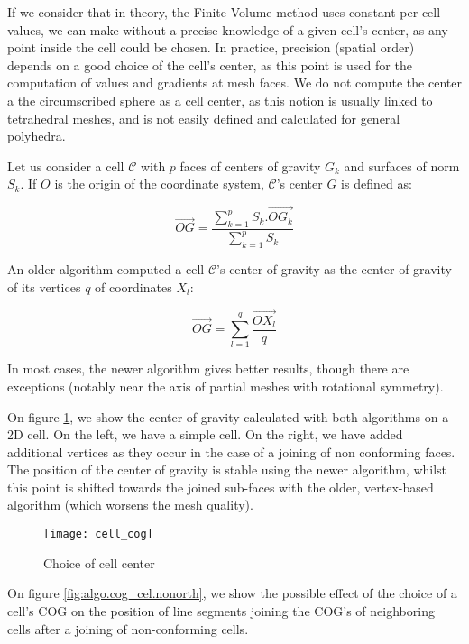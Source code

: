 If we consider that in theory, the Finite Volume method uses constant
per-cell values, we can make without a precise knowledge of a given cell's
center, as any point inside the cell could be chosen.
In practice, precision (spatial order) depends on a good choice of
the cell's center, as this point is used for the computation of values
and gradients at mesh faces.
We do not compute the center a the circumscribed sphere as
a cell center, as this notion is usually linked to tetrahedral meshes,
and is not easily defined and calculated for general polyhedra.

Let us consider a cell $\mathcal{C}$ with $p$ faces of centers of gravity
$G_k$ and surfaces of norm $S_k$. If $O$ is the origin of the coordinate
system, $\mathcal{C}$'s center $G$ is defined as:

\begin{displaymath}
\overrightarrow{OG}
= \frac{\sum_{k=1}^p S_k.\overrightarrow{OG_k}}
       {\sum_{k=1}^p S_k}
\end{displaymath}

An older algorithm computed a cell $\mathcal{C}$'s center of gravity as the
center of gravity of its vertices $q$ of coordinates $X_l$:

$$\overrightarrow{OG} = \sum_{l=1}^q \frac{\overrightarrow{OX_l}}{q}$$

In most cases, the newer algorithm gives better results, though there
are exceptions (notably near the axis of partial meshes with rotational symmetry).

On figure \ref{fig:algo.cog_cel.loc}, we show the center of gravity
calculated with both algorithms on a 2D cell. On the left, we have
a simple cell. On the right, we have added additional vertices as they
occur in the case of a joining of non conforming faces. The position
of the center of gravity is stable using the newer algorithm, whilst
this point is shifted towards the joined sub-faces with the older,
vertex-based algorithm (which worsens the mesh quality).

\begin{figure}[!h]
\centerline{
\texttt{[image: cell\_cog]}}
\caption{Choice of cell center}
\label{fig:algo.cog_cel.loc}
\end{figure}

On figure \ref{fig:algo.cog_cel.nonorth}, we show the possible effect of
the choice of a cell's COG on the position of line segments joining the COG's
of neighboring cells after a joining of non-conforming cells.

